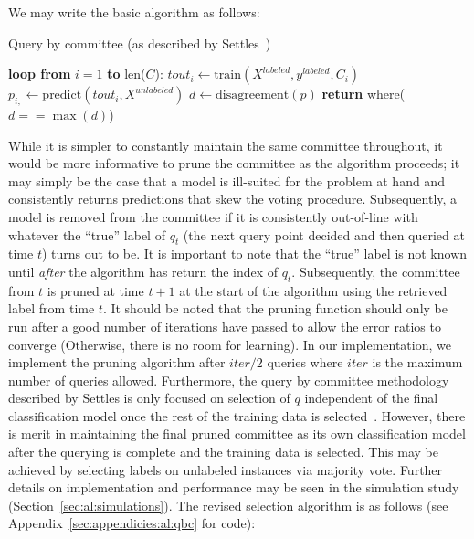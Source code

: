 We may write the basic algorithm as follows:

\tablespacing
\begin{algorithm}[H]
	\caption{Query by committee (as described by 
	Settles~\cite{settles2010})}\label{alg:al:methods:qbc1}
	\begin{algorithmic}[1]
		\State \textbf{loop from} $i=1$ \textbf{to} len($C$):
		\State \indent $\textit{tout}_{i} \gets 
		\text{train}(X^{labeled},y^{labeled},C_i)$
		\State \indent $p_{i,} \gets 
		\text{predict}(\textit{tout}_i,X^{unlabeled})$
		\State $d \gets \text{disagreement}(p)$
		\State \textbf{return} where($d==\max{(d)}$)
		\EndProcedure
	\end{algorithmic}
\end{algorithm}
\bodyspacing

\noindent While it is simpler to constantly maintain the same committee 
throughout, it would be more informative to prune the committee as the 
algorithm proceeds; it may simply be the case that a model is ill-suited for 
the problem at hand and consistently returns predictions that skew the voting 
procedure. Subsequently, a model is removed from the committee if it is 
consistently out-of-line with whatever the ``true'' label of $q_t$ (the next 
query point decided and then queried at time $t$) turns out to be. It is 
important to note that the ``true'' label is not known until \textit{after} the 
algorithm has return the index of $q_t$. Subsequently, the committee from $t$ 
is pruned at time $t+1$ at the start of the algorithm using the retrieved 
label from time $t$. It should be noted that the pruning function should only 
be run after a good number of iterations have passed to allow the error ratios 
to converge (Otherwise, there is no room for learning). In our implementation, 
we implement the pruning algorithm after $iter/2$ queries where $iter$ is the 
maximum number of queries allowed.
Furthermore, the query by committee methodology described by Settles is only 
focused on selection of $q$ independent of the final classification model 
once the rest of the training data is selected~\cite{settles2010}. However, 
there is merit in maintaining the final pruned committee as its own 
classification model after the querying is complete and the training data is 
selected. This may be achieved by selecting labels on unlabeled instances via 
majority vote. Further details on implementation and performance may be seen in 
the simulation study (Section~\ref{sec:al:simulations}). The revised selection 
algorithm is as follows (see Appendix~\ref{sec:appendicies:al:qbc} for code):

